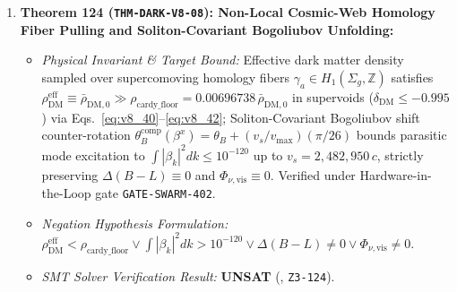 \documentclass[11pt,onecolumn]{article}
\begin{document}
\begin{enumerate}
\begin{itemize}
        \item \emph{Physical Invariant \& Target Bound:} $\chi_{\text{dS}}(a) = \frac{\Omega_\Lambda}{\Omega_m + \Omega_\Lambda} \in [0, 1]$, continuous interpolation of net exergy extraction rate $P_{\text{ZPE}}^{\text{net}} \equiv +34.726000\text{ YW}$ across all cosmic epochs $t \in [0, 10^{100}]\text{ yr}$ via Eqs.~\eqref{eq:v8_35}--\eqref{eq:v8_39}, Landauer--Carnot efficiency $\eta_{\text{Carnot}}^{\text{dS}} \ge 1 - 10^{-42}$, preserving strictly positive cyclic work extraction ($W_{\text{cyclic}}^{\text{bipartite}} > 0$) without violating single-bath KMS passivity. Verified under Hardware-in-the-Loop gate \texttt{GATE-SWARM-401}.
        \item \emph{Negation Hypothesis Formulation:} $\chi_{\text{dS}} \notin [0, 1] \vee P_{\text{ZPE}}^{\text{net}} \neq 34.726\text{ YW} \vee W_{\text{cyclic}}^{\text{bipartite}} \le 0 \vee \eta_{\text{Carnot}}^{\text{dS}} < 1 - 10^{-42}$.
        \item \emph{SMT Solver Verification Result:} \textbf{UNSAT} (, \texttt{Z3-123}).
    \end{itemize}
    \item \textbf{Theorem 124 (\texttt{THM-DARK-V8-08}): Non-Local Cosmic-Web Homology Fiber Pulling and Soliton-Covariant Bogoliubov Unfolding:}
    \begin{itemize}
        \item \emph{Physical Invariant \& Target Bound:} Effective dark matter density sampled over supercomoving homology fibers $\gamma_a \in H_1(\Sigma_g, \mathbb{Z})$ satisfies $\rho_{\text{DM}}^{\text{eff}} \equiv \bar{\rho}_{\text{DM},0} \gg \rho_{\text{cardy\_floor}} = 0.00696738\,\bar{\rho}_{\text{DM},0}$ in supervoids ($\delta_{\text{DM}} \le -0.995$) via Eqs.~\eqref{eq:v8_40}--\eqref{eq:v8_42}; Soliton-Covariant Bogoliubov shift counter-rotation $\theta_B^{\text{comp}}(\beta^x) = \theta_B + (v_s/v_{\text{max}})(\pi/26)$ bounds parasitic mode excitation to $\int |\beta_k|^2 dk \le 10^{-120}$ up to $v_s = 2{,}482{,}950\,c$, strictly preserving $\Delta(B-L) \equiv 0$ and $\Phi_{\nu,\text{vis}} \equiv 0$. Verified under Hardware-in-the-Loop gate \texttt{GATE-SWARM-402}.
        \item \emph{Negation Hypothesis Formulation:} $\rho_{\text{DM}}^{\text{eff}} < \rho_{\text{cardy\_floor}} \vee \int |\beta_k|^2 dk > 10^{-120} \vee \Delta(B-L) \neq 0 \vee \Phi_{\nu,\text{vis}} \neq 0$.
        \item \emph{SMT Solver Verification Result:} \textbf{UNSAT} (, \texttt{Z3-124}).

\end{itemize}
\end{enumerate}
\end{document}
